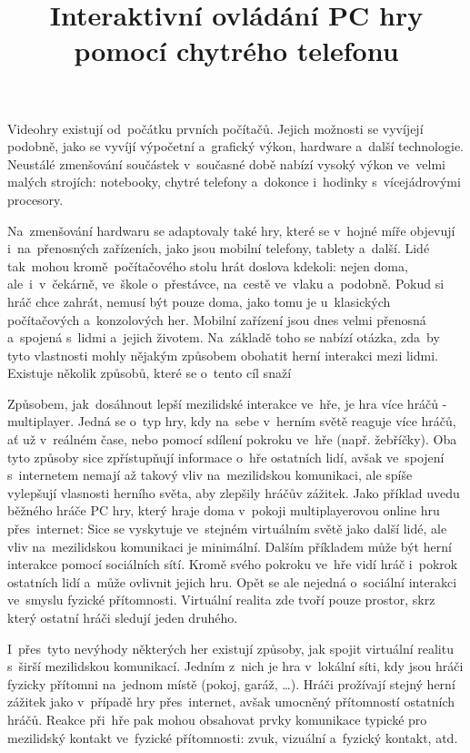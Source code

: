 \documentclass[thesis=B,czech,hidelinks]{FITthesis}[2012/06/26] %
\title{Interaktivn{\' i} ovl{\' a}d{\' a}n{\' i} PC hry pomoc{\' i} chytr{\' e}ho telefonu}
\begin{document}

\begin{introduction}
Videohry existují od~počátku prvních počítačů. \cite{rylich} Jejich možnosti se vyvíjejí podobně, jako se vyvíjí výpočetní a~grafický výkon, hardware a~další technologie. Neustálé zmenšování součástek v~současné době nabízí vysoký výkon ve~velmi malých strojích: notebooky, chytré telefony a~dokonce i~hodinky s~vícejádrovými procesory. \cite{kupi}

Na~zmenšování hardwaru se adaptovaly také hry, které se v~hojné míře objevují i~na~přenosných zařízeních, jako jsou mobilní telefony, tablety a~další. Lidé tak~mohou kromě~počítačového stolu hrát doslova kdekoli: nejen doma, ale~i~v~čekárně, ve~škole o~přestávce, na~cestě ve~vlaku a~podobně. Pokud si hráč chce zahrát, nemusí být pouze doma, jako tomu je u~klasických počítačových a~konzolových her. Mobilní zařízení jsou dnes velmi přenosná a~spojená s~lidmi a~jejich životem. Na~základě toho se nabízí otázka, zda~by tyto vlastnosti mohly nějakým způsobem obohatit herní interakci mezi lidmi. Existuje několik způsobů, které se o~tento cíl snaží

Způsobem, jak~dosáhnout lepší mezilidské interakce ve~hře, je hra více hráčů - multiplayer. Jedná se o~typ hry, kdy na~sebe v~herním světě reaguje více hráčů, ať už v~reálném čase, nebo pomocí sdílení pokroku ve~hře (např. žebříčky). Oba tyto způsoby sice zpřístupňují informace o~hře ostatních lidí, avšak ve~spojení s~internetem nemají až takový vliv na~mezilidskou komunikaci, ale spíše vylepšují vlasnosti herního světa, aby zlepšily hráčův zážitek. Jako příklad uvedu běžného hráče PC hry, který hraje doma v~pokoji multiplayerovou online hru přes~internet: Sice se vyskytuje ve~stejném virtuálním světě jako další lidé, ale vliv na~mezilidskou komunikaci je minimální. Dalším příkladem může být herní interakce pomocí sociálních sítí. Kromě svého pokroku ve~hře vidí hráč i~pokrok ostatních lidí a~může ovlivnit jejich hru. Opět se ale nejedná o~sociální interakci ve~smyslu fyzické přítomnosti. Virtuální realita zde tvoří pouze prostor, skrz který ostatní hráči sledují jeden druhého.

I~přes~tyto nevýhody některých her existují způsoby, jak spojit virtuální realitu s~širší mezilidskou komunikací. Jedním z~nich je hra v~lokální síti, kdy jsou hráči fyzicky přítomni na~jednom místě (pokoj, garáž, …). Hráči prožívají stejný herní zážitek jako v~případě hry přes~internet, avšak umocněný přítomností ostatních hráčů. Reakce při~hře pak mohou obsahovat prvky komunikace typické pro mezilidský kontakt ve~fyzické přítomnosti: zvuk, vizuální a~fyzický kontakt, atd.


\end{introduction}
\end{document}
